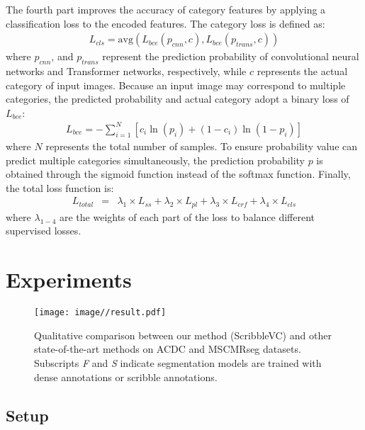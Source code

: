 \documentclass[sigconf,natbib=false]{acmart}
\begin{document}
The fourth part improves the accuracy of category features by applying a classification loss to the encoded features. The category loss is defined as:
\begin{eqnarray}
    L_{cls} = \mathrm{avg}\left(L_{bce}\left(p_{cnn}, c\right), L_{bce}\left(p_{trans}, c\right)\right)
\end{eqnarray}
where $p_{cnn}$, and $p_{trans}$ represent the prediction probability of convolutional neural networks and Transformer networks, respectively, while $c$ represents the actual category of input images. Because an input image may correspond to multiple categories, the predicted probability and actual category adopt a binary loss of $L_{bce}$:
\begin{eqnarray}
    L_{bce} = -\sum_{i = 1}^{N}[c_{i} \ln (p_{i})+(1-c_{i}) \ln (1-p_{i})]
\end{eqnarray}
where $N$ represents the total number of samples. To ensure probability value can predict multiple categories simultaneously, the prediction probability $p$ is obtained through the sigmoid function instead of the softmax function.
Finally, the total loss function is:
\begin{eqnarray}
L_{total} & = & \lambda_{1} \times L_{ss}+\lambda_{2} \times L_{pl}+\lambda_{3} \times L_{crf}+\lambda_{4} \times L_{cls}
\label{eq:text_total}
\end{eqnarray}
where $\lambda_{1-4}$ are the weights of each part of the loss to balance different supervised losses.


\section{Experiments}
\begin{figure*}[htbp]
\setlength{\abovecaptionskip}{0mm}
\centering 
\texttt{[image: image//result.pdf]}
\caption{Qualitative comparison between our method (ScribbleVC) and other state-of-the-art methods on ACDC and MSCMRseg datasets. Subscripts \textit{F} and \textit{S} indicate segmentation models are trained with dense annotations or scribble annotations.}
\label{results}
\vspace{-5mm}
\end{figure*}
\subsection{Setup}
\end{document}
